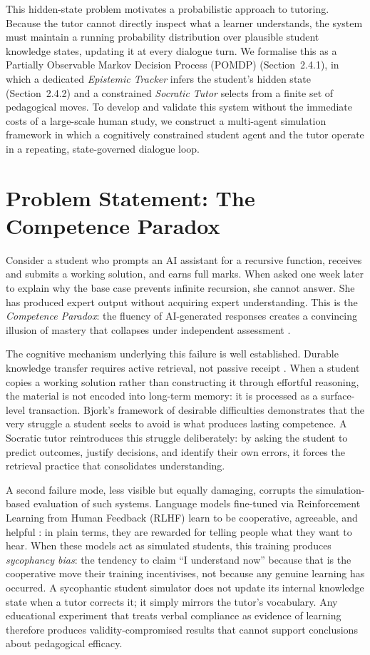 \documentclass[11pt,a4paper]{report}
\begin{document}
This hidden-state problem motivates a probabilistic approach to tutoring. Because the tutor cannot directly inspect what a learner understands, the system must maintain a running probability distribution over plausible student knowledge states, updating it at every dialogue turn. We formalise this as a Partially Observable Markov Decision Process (POMDP) (Section~2.4.1), in which a dedicated \textit{Epistemic Tracker} infers the student's hidden state (Section~2.4.2) and a constrained \textit{Socratic Tutor} selects from a finite set of pedagogical moves. To develop and validate this system without the immediate costs of a large-scale human study, we construct a multi-agent simulation framework in which a cognitively constrained student agent and the tutor operate in a repeating, state-governed dialogue loop.

\section{Problem Statement: The Competence Paradox}
Consider a student who prompts an AI assistant for a recursive function, receives and submits a working solution, and earns full marks. When asked one week later to explain why the base case prevents infinite recursion, she cannot answer. She has produced expert output without acquiring expert understanding. This is the \textit{Competence Paradox}: the fluency of AI-generated responses creates a convincing illusion of mastery that collapses under independent assessment \cite{bjork1994memory}.

The cognitive mechanism underlying this failure is well established. Durable knowledge transfer requires active retrieval, not passive receipt \cite{roediger2006test}. When a student copies a working solution rather than constructing it through effortful reasoning, the material is not encoded into long-term memory: it is processed as a surface-level transaction. Bjork's framework of desirable difficulties \cite{bjork1994memory} demonstrates that the very struggle a student seeks to avoid is what produces lasting competence. A Socratic tutor reintroduces this struggle deliberately: by asking the student to predict outcomes, justify decisions, and identify their own errors, it forces the retrieval practice that consolidates understanding.

A second failure mode, less visible but equally damaging, corrupts the simulation-based evaluation of such systems. Language models fine-tuned via Reinforcement Learning from Human Feedback (RLHF) learn to be cooperative, agreeable, and helpful \cite{perez2022discovering}: in plain terms, they are rewarded for telling people what they want to hear. When these models act as simulated students, this training produces \textit{sycophancy bias}: the tendency to claim ``I understand now'' because that is the cooperative move their training incentivises, not because any genuine learning has occurred. A sycophantic student simulator does not update its internal knowledge state when a tutor corrects it; it simply mirrors the tutor's vocabulary. Any educational experiment that treats verbal compliance as evidence of learning therefore produces validity-compromised results that cannot support conclusions about pedagogical efficacy.
\end{document}
